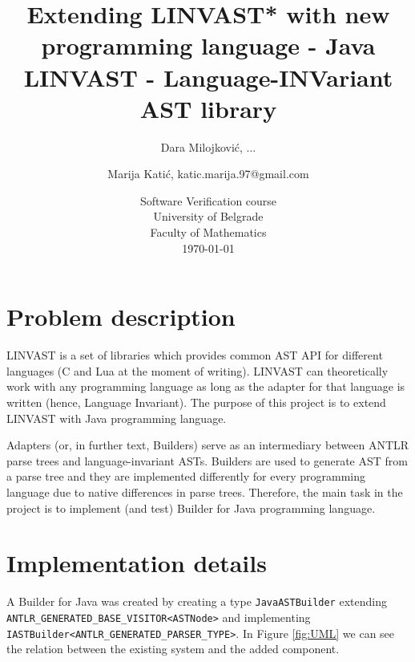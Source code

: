 \documentclass[a4paper]{article}
\begin{document}
\title{Extending LINVAST* with new programming language - Java \\[\baselineskip]
\large *LINVAST - Language-INVariant AST library}


\author{Dara Milojković, ... \and Marija Katić, katic.marija.97@gmail.com}

\date{Software Verification course \\ University of Belgrade \\Faculty of Mathematics\\[\baselineskip] \today}

\maketitle

\tableofcontents

\section{Problem description}
\label{sec:problem_description}
LINVAST is a set of libraries which provides common AST API for different languages (C and Lua at the moment of writing). LINVAST can theoretically work with any programming language as long as the adapter for that language is written (hence, Language Invariant).
The purpose of this project is to extend LINVAST with Java programming language.

Adapters (or, in further text, Builders) serve as an intermediary between ANTLR parse trees and language-invariant ASTs. Builders are used to generate AST from a parse tree and they are implemented differently for every programming language due to native differences in parse trees.
Therefore, the main task in the project is to implement (and test) Builder for Java programming language.

\section{Implementation details}
\label{sec:implementation_details}

A Builder for Java was created by creating a type \texttt{JavaASTBuilder} extending \texttt{ANTLR\_GENERATED\_BASE\_VISITOR<ASTNode>} and implementing \\
\texttt{IASTBuilder<ANTLR\_GENERATED\_PARSER\_TYPE>}. In Figure \ref{fig:UML} we can see  the relation between the existing system and the added component.
\end{document}
